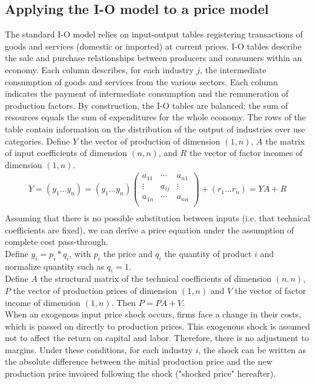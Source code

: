 \documentclass[11pt,a4paper]{article}
\begin{document}
\subsection{Applying the I-O model to a price model}
\label{subsec:ioprice}
The standard I-O model relies on input-output tables registering transactions of goods and services (domestic or imported) at current prices. I-O tables describe the sale and purchase relationships between producers and consumers within an economy. Each column describes, for each industry $j$, the intermediate consumption of goods and services from the various sectors. Each column indicates the payment of intermediate consumption and the remuneration of production factors. By construction, the I-O tables are balanced: the sum of resources equals the sum of expenditures for the whole economy. The rows of the table contain information on the distribution of the output of industries over use categories.
Define $Y$ the vector of production of dimension $(1, n)$, $A$ the matrix of input coefficients of dimension $(n, n)$, and $R$ the vector of factor incomes of dimension $(1, n)$.\\
\begin{eqnarray}
	Y=(y_1\ldots y_n)=\left(y_1\ldots y_n\right)\left( \begin{matrix}
   a_{11} & \cdots  & a_{n1}  \\
   \vdots  & a_{ij} & \vdots   \\
   a_{1n} & \cdots  & a_{nn}  \\
\end{matrix} \right)+(r_1\ldots r_n)=YA+R\\
\end{eqnarray}
Assuming that there is no possible substitution between inputs (i.e. that technical coefficients are fixed), we can derive a price equation under the assumption of complete cost pass-through.\\
Define $y_i=p_i*q_i$, with $p_i$ the price and $q_i$ the quantity of product $i$ and normalize quantity such as $q_i=1$. \\
Define $A$ the structural matrix of the technical coefficients of dimension $(n, n)$, $P$ the vector of production prices of dimension $(1, n)$ and $V$ the vector of factor income of dimension $(1, n)$. Then $P=PA+V$. \\
When an exogenous input price shock occurs, firms face a change in their costs, which is passed on directly to production prices. This exogenous shock is assumed not to affect the return on capital and labor. Therefore, there is no adjustment to margins. Under these conditions, for each industry $i$, the shock can be written as the absolute difference between the initial production price and the new production price invoiced following the shock ("shocked price" hereafter).\\
\end{document}

